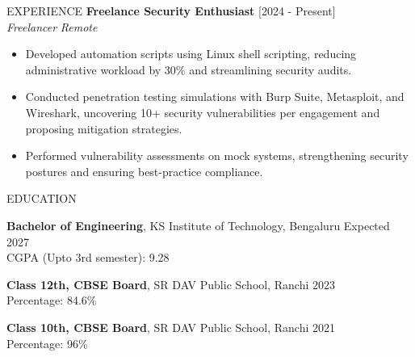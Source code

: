 \documentclass{resume} %
\begin{document}
\begin{rSection}{EXPERIENCE}
    \textbf{Freelance Security Enthusiast} \hfill [2024 - Present] \\
\textit{Freelancer} \vspace{0.1em} \hfill \textit{Remote}
\begin{itemize}
    \itemsep -3pt
    \item Developed automation scripts using Linux shell scripting, reducing administrative workload by 30\% and streamlining security audits.
    \item Conducted penetration testing simulations with Burp Suite, Metasploit, and Wireshark, uncovering 10+ security vulnerabilities per engagement and proposing mitigation strategies.
    \item Performed vulnerability assessments on mock systems, strengthening security postures and ensuring best-practice compliance.
\end{itemize}

\end{rSection}

\vspace{0.5em}

\begin{rSection}{EDUCATION}

    \textbf{Bachelor of Engineering}, KS Institute of Technology, Bengaluru \hfill Expected 2027 \\
    CGPA (Upto 3rd semester): 9.28
    \vspace{0.2em}

    \textbf{Class 12th, CBSE Board}, SR DAV Public School, Ranchi \hfill 2023 \\
    Percentage: 84.6\%
    \vspace{0.2em}

    \textbf{Class 10th, CBSE Board}, SR DAV Public School, Ranchi \hfill 2021 \\
    Percentage: 96\%
    
\end{rSection}

\vspace{0.5em}
\end{document}
